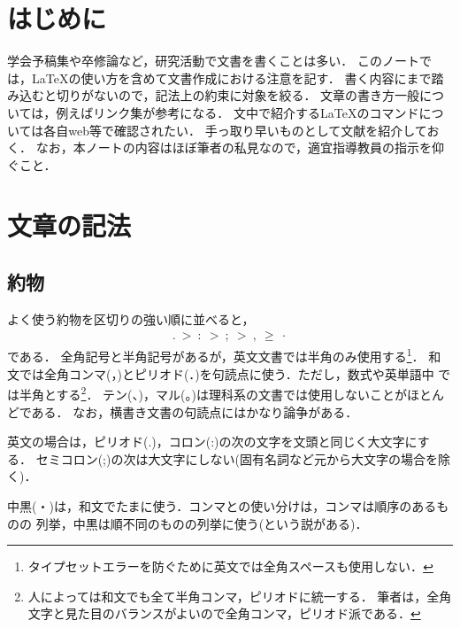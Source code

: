 \documentclass[a4paper,10pt,twocolumn,dvipdfmx]{jsarticle}
\theoremstyle{definition}
\begin{document}

\section{はじめに}\label{sec:intro}
学会予稿集や卒修論など，研究活動で文書を書くことは多い．
このノートでは，\LaTeX の使い方を含めて文書作成における注意を記す．
書く内容にまで踏み込むと切りがないので，記法上の約束に対象を絞る．
文章の書き方一般については，例えばリンク集\cite{acwrting}が参考になる．
文中で紹介する\LaTeX のコマンドについては各自web等で確認されたい．
手っ取り早いものとして文献\cite{cheetsheet}を紹介しておく．
なお，本ノートの内容はほぼ筆者の私見なので，適宜指導教員の指示を仰ぐこと．

\section{文章の記法}\label{sec:comma}
\subsection{約物}

よく使う約物を区切りの強い順に並べると，
\begin{align}
 .\ >\ :\ >\ ;\ >\ ,\ \geq\ \cdot
\end{align}
である．
全角記号と半角記号があるが，英文文書では半角のみ使用する\footnote{%
タイプセットエラーを防ぐために英文では全角スペースも使用しない．}．
和文では全角コンマ(，)とピリオド(．)を句読点に使う．ただし，数式や英単語中
では半角とする\footnote{人によっては和文でも全て半角コンマ，ピリオドに統一する．
筆者は，全角文字と見た目のバランスがよいので全角コンマ，ピリオド派である．}．
テン(、)，マル(。)は理科系の文書では使用しないことがほとんどである．
なお，横書き文書の句読点にはかなり論争がある\cite{tenmaru}．

英文の場合は，ピリオド(.)，コロン(:)の次の文字を文頭と同じく大文字にする．
セミコロン(;)の次は大文字にしない(固有名詞など元から大文字の場合を除く)．

中黒(・)は，和文でたまに使う．コンマとの使い分けは，コンマは順序のあるものの
列挙，中黒は順不同のものの列挙に使う(という説がある)．
\end{document}
